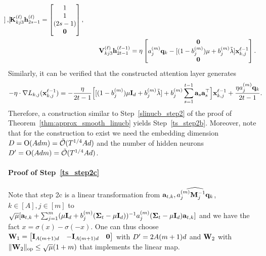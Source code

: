 \begin{align*}
\begin{bmatrix}
    \end{bmatrix}, 
{\mathbf K}_{kj3}^{(\ell)}{\mathbf h}^{(\ell)}_{2s-1}=\begin{bmatrix}
        1\\ 1 \\(2s-1)\\{\mathbf 0}
    \end{bmatrix}, \\&\qquad~{\mathbf V}_{kj3}^{(\ell)}{\mathbf h}^{(\ell-1)}_{2t-1}=\eta\begin{bmatrix}
        {\mathbf 0}\\ a_j^{(m)}{\mathbf {q}}_k-[(1-b_j^{(m)}){\mu}+b_j^{(m)}\tilde\lambda]{\mathbf x}_{k,j}^{\ell-1}\\ {\mathbf 0}
    \end{bmatrix}.
\end{align*}
Similarly, it can be verified that the constructed attention layer generates 
\begin{align*}
  -\eta\cdot\nabla L_{k,j}({\mathbf x}_{k,j}^{\ell-1})=-\frac{\eta}{2t-1}\Big[ [(1-b_j^{(m)}){\mu}{\mathbf I}_d+b_j^{(m)}\tilde\lambda]+b_j^{(m)}\sum_{s=1}^{t-1}{\mathbf a}_s{\mathbf a}_s^\top \Big]{\mathbf x}_{k,j}^{\ell-1}+\frac{\eta a_j^{(m)}{\mathbf {q}}_k}{2t-1}.
\end{align*} 
Therefore,  a  construction similar to  Step~\ref{slinucb_step2} of the proof of Theorem~\ref{thm:approx_smooth_linucb} yields Step~\ref{ts_step2b}. Moreover, note that for the construction to exist  we need the embedding dimension  $D={\mathrm{O}}(Adm)={\tilde{\mathcal O}}(T^{1/4}Ad)$ and the number of hidden neurons ${D'}={\mathrm{O}}(Adm)={\tilde{\mathcal O}}(T^{1/4}Ad)$.

\paragraph{Proof of Step~\ref{ts_step2c}}
Note that step 2c is a linear transformation from ${\mathbf a}_{t,k},\widehat{a_j^{(m)}{\mathbf {M}}_j^{-1}{\mathbf {q}}_k}$, $k\in[A],j\in[m]$ to  $\sqrt{{\mu}} [{\mathbf a}_{t,k}+\sum_{j=1}^m ({{\mu}}{\mathbf I}_d+{b_j^{(m)}({{\mathbf\Sigma}}_t-{\mu} {\mathbf I}_d)})^{-1}{a_j^{(m)}({{\mathbf\Sigma}}_t-{\mu} {\mathbf I}_d){\mathbf a}_{t,k}} ]$ and we have the fact $x=\sigma(x)-\sigma(-x)$. One can thus choose ${\mathbf W}_1=\begin{bmatrix}
    {\mathbf I}_{A(m+1)d} & -{\mathbf I}_{A(m+1)d}&{\mathbf 0}
\end{bmatrix}$ with ${D'}=2A(m+1)d$ and ${\mathbf W}_2$ with $\|{{\mathbf W}_2}\|_{\mathrm{op}}\leq \sqrt{{\mu}}(1+m)$ that implements the linear map.




